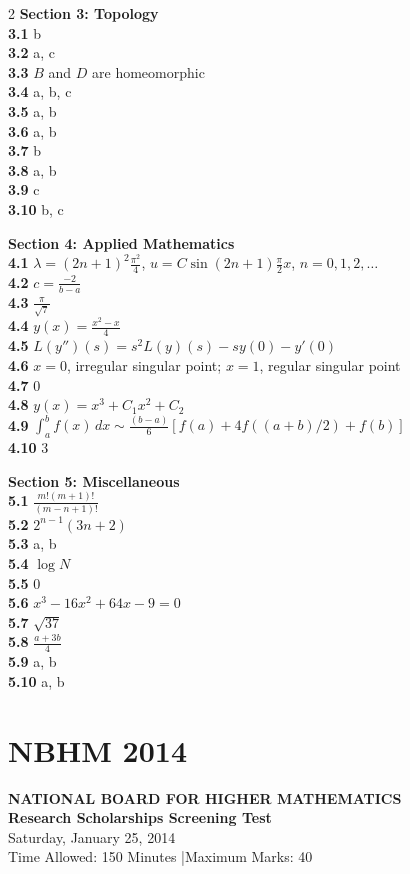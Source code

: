 \documentclass[11pt,a4paper]{article}
\newcommand{\examheader}[4]{%
  \clearpage
  \section{#1}
  \begin{center}
    {\large\bfseries NATIONAL BOARD FOR HIGHER MATHEMATICS}\\[3pt]
    {\bfseries #2}\\[2pt]
    {#3}\\[2pt]
    {\small #4}
  \end{center}
  \vspace{4pt}
}
\begin{document}
\begin{multicols}{2}
\medskip
\textbf{Section 3: Topology}\\
\textbf{3.1} b\\
\textbf{3.2} a, c\\
\textbf{3.3} $B$ and $D$ are homeomorphic\\
\textbf{3.4} a, b, c\\
\textbf{3.5} a, b\\
\textbf{3.6} a, b\\
\textbf{3.7} b\\
\textbf{3.8} a, b\\
\textbf{3.9} c\\
\textbf{3.10} b, c

\medskip
\textbf{Section 4: Applied Mathematics}\\
\textbf{4.1} $\lambda = (2n+1)^2\frac{\pi^2}{4}$, $u = C\sin(2n+1)\frac{\pi}{2}x$, $n = 0, 1, 2, \dots$\\
\textbf{4.2} $c = \frac{-2}{b - a}$\\
\textbf{4.3} $\frac{\pi}{\sqrt{7}}$\\
\textbf{4.4} $y(x) = \frac{x^2 - x}{4}$\\
\textbf{4.5} $L(y'')(s) = s^2 L(y)(s) - sy(0) - y'(0)$\\
\textbf{4.6} $x = 0$, irregular singular point; $x = 1$, regular singular point\\
\textbf{4.7} $0$\\
\textbf{4.8} $y(x) = x^3 + C_1 x^2 + C_2$\\
\textbf{4.9} $\int_a^b f(x)\,dx \sim \frac{(b-a)}{6}[f(a) + 4f((a+b)/2) + f(b)]$\\
\textbf{4.10} $3$

\medskip
\textbf{Section 5: Miscellaneous}\\
\textbf{5.1} $\frac{m!(m+1)!}{(m-n+1)!}$\\
\textbf{5.2} $2^{n-1}(3n+2)$\\
\textbf{5.3} a, b\\
\textbf{5.4} $\log N$\\
\textbf{5.5} $0$\\
\textbf{5.6} $x^3 - 16x^2 + 64x - 9 = 0$\\
\textbf{5.7} $\sqrt{37}$\\
\textbf{5.8} $\frac{a + 3b}{4}$\\
\textbf{5.9} a, b\\
\textbf{5.10} a, b
\end{multicols}
\examheader{NBHM 2014}{Research Scholarships Screening Test}{Saturday, January 25, 2014}{Time Allowed: 150 Minutes \quad|\quad Maximum Marks: 40}
\end{document}
